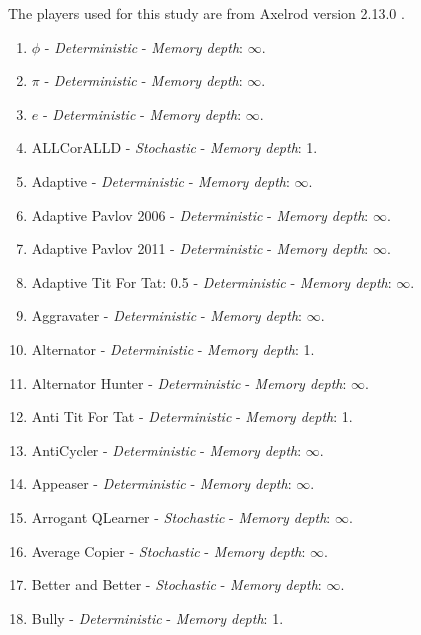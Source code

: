 \documentclass[10pt,letterpaper]{article}
\begin{document}
The players used for this study are from Axelrod version 2.13.0
\cite{axelrodproject}.

\begin{enumerate}
\item $\phi$ - \textit{Deterministic} - \textit{Memory depth}: \(\infty\). \cite{axelrodproject}
\item $\pi$ - \textit{Deterministic} - \textit{Memory depth}: \(\infty\). \cite{axelrodproject}
\item $e$ - \textit{Deterministic} - \textit{Memory depth}: \(\infty\). \cite{axelrodproject}
\item ALLCorALLD - \textit{Stochastic} - \textit{Memory depth}: 1. \cite{axelrodproject}
\item Adaptive - \textit{Deterministic} - \textit{Memory depth}: \(\infty\). \cite{Li2011}
\item Adaptive Pavlov 2006 - \textit{Deterministic} - \textit{Memory depth}: \(\infty\). \cite{kendall2007iterated}
\item Adaptive Pavlov 2011 - \textit{Deterministic} - \textit{Memory depth}: \(\infty\). \cite{Li2011}
\item Adaptive Tit For Tat: 0.5 - \textit{Deterministic} - \textit{Memory depth}: \(\infty\). \cite{Tzafestas2000}
\item Aggravater - \textit{Deterministic} - \textit{Memory depth}: \(\infty\). \cite{axelrodproject}
\item Alternator - \textit{Deterministic} - \textit{Memory depth}: 1. \cite{Axelrod1984, Mittal2009}
\item Alternator Hunter - \textit{Deterministic} - \textit{Memory depth}: \(\infty\). \cite{axelrodproject}
\item Anti Tit For Tat - \textit{Deterministic} - \textit{Memory depth}: 1. \cite{Hilbe2013}
\item AntiCycler - \textit{Deterministic} - \textit{Memory depth}: \(\infty\). \cite{axelrodproject}
\item Appeaser - \textit{Deterministic} - \textit{Memory depth}: \(\infty\). \cite{axelrodproject}
\item Arrogant QLearner - \textit{Stochastic} - \textit{Memory depth}: \(\infty\). \cite{axelrodproject}
\item Average Copier - \textit{Stochastic} - \textit{Memory depth}: \(\infty\). \cite{axelrodproject}
\item Better and Better - \textit{Stochastic} - \textit{Memory depth}: \(\infty\). \cite{Prison1998}
\item Bully - \textit{Deterministic} - \textit{Memory depth}: 1. \cite{Nachbar1992}

\end{enumerate}
\end{document}
